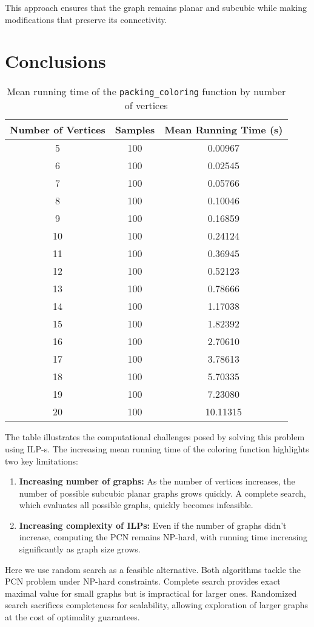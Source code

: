 \documentclass[12pt,a4paper]{amsart}
\theoremstyle{definition}
\theoremstyle{plain}
\begin{document}
This approach ensures that the graph remains planar and subcubic while making modifications that preserve its connectivity.


\section{Conclusions}

\begin{table}[h]
    \centering
    \begin{tabular}{ccc}
        \toprule
        \textbf{Number of Vertices} & \textbf{Samples} & \textbf{Mean Running Time (s)} \\
        \midrule
        5  & 100 & 0.00967 \\
        6  & 100 & 0.02545 \\
        7  & 100 & 0.05766 \\
        8  & 100 & 0.10046 \\
        9  & 100 & 0.16859 \\
        10 & 100 & 0.24124 \\
        11 & 100 & 0.36945 \\
        12 & 100 & 0.52123 \\
        13 & 100 & 0.78666 \\
        14 & 100 & 1.17038 \\
        15 & 100 & 1.82392 \\
        16 & 100 & 2.70610 \\
        17 & 100 & 3.78613 \\
        18 & 100 & 5.70335 \\
        19 & 100 & 7.23080 \\
        20 & 100 & 10.11315 \\
        \bottomrule
    \end{tabular}
    \caption{Mean running time of the \texttt{packing\_coloring} function by number of vertices}
    \label{tab:coloring_time}
\end{table}

The table illustrates the computational challenges posed by solving this problem using ILP-s. The increasing mean running time of the coloring function highlights two key limitations:

\begin{enumerate}
    \item \textbf{Increasing number of graphs:}  
    As the number of vertices increases, the number of possible subcubic planar graphs grows quickly. A complete search, which evaluates all possible graphs, quickly becomes infeasible.

    \item \textbf{Increasing complexity of ILPs:}  
    Even if the number of graphs didn't increase, computing the PCN remains NP-hard, with running time increasing significantly as graph size grows.
\end{enumerate}

Here we use random search as a feasible alternative. Both algorithms tackle the PCN problem under NP-hard constraints. Complete search provides exact maximal value for small graphs but is impractical for larger ones. Randomized search sacrifices completeness for scalability, allowing exploration of larger graphs at the cost of optimality guarantees. 
\end{document}
